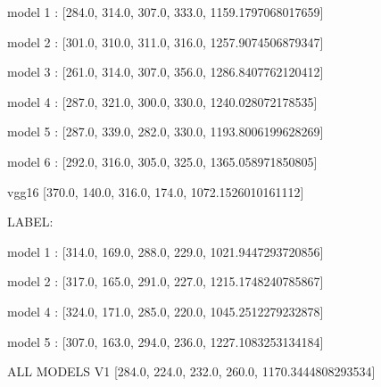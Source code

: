 \documentclass[11pt]{article}
\begin{document}
\begin{onehalfspace}
model 1 : [284.0, 314.0, 307.0, 333.0, 1159.1797068017659]

model 2 : [301.0, 310.0, 311.0, 316.0, 1257.9074506879347]

model 3 : [261.0, 314.0, 307.0, 356.0, 1286.8407762120412]

model 4 : [287.0, 321.0, 300.0, 330.0, 1240.028072178535]

model 5 : [287.0, 339.0, 282.0, 330.0, 1193.8006199628269]

model 6 : [292.0, 316.0, 305.0, 325.0, 1365.058971850805]

vgg16 [370.0, 140.0, 316.0, 174.0, 1072.1526010161112]


LABEL:

model 1 : [314.0, 169.0, 288.0, 229.0, 1021.9447293720856]

model 2 : [317.0, 165.0, 291.0, 227.0, 1215.1748240785867]

model 4 : [324.0, 171.0, 285.0, 220.0, 1045.2512279232878]

model 5 : [307.0, 163.0, 294.0, 236.0, 1227.1083253134184]

ALL MODELS V1 [284.0, 224.0, 232.0, 260.0, 1170.3444808293534]



\end{onehalfspace}
\end{document}
